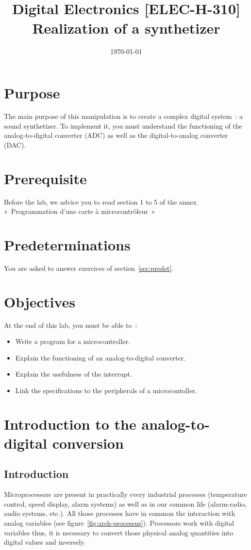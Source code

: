 \documentclass[11pt,a4paper]{article}
\date{\vspace{-1.7cm}\mydate\today}
\title{\vspace{-2cm} \labonumber\\ Digital Electronics [ELEC-H-310]\\Realization of a synthetizer\ifthenelse{\boolean{corrige}}{~\\Solution}{}}
\theoremstyle{definition}%
\begin{document}
\pagestyle{empty}
\maketitle
\section*{Purpose}
The main purpose of this manipulation is to create a complex digital system~: a sound synthetizer.
To implement it, you must understand the functioning of the analog-to-digital converter (ADC) as well as the digital-to-analog converter (DAC).

\section*{Prerequisite}
Before the lab, we advice you to read section 1 to 5 of the annex «~Programmation d’une carte à microcontrôleur~»

\section*{Predeterminations}
You are asked to answer exercices of section~\ref{sec:predet}.

\section*{Objectives}
At the end of this lab, you must be able to~:
\begin{itemize}
	\item Write a program for a microcontroller.
	\item Explain the functioning of an analog-to-digital converter.
	\item Explain the usefulness of the interrupt.
	\item Link the specifications to the peripherals of a microcontoller.
\end{itemize}

\newpage{}

\section{Introduction to the analog-to-digital conversion}

\subsection{Introduction}
Microprocessors are present in practically every industrial processes (temperature control, speed display, alarm systems) as well as in our common life (alarm-radio, audio systems, etc.).
All those processes have in common the interaction with analog variables (see figure~\ref{fig:arch-processus}).
Processors work with digital variables thus, it is necessary to convert those physical analog quantities into digital values and inversely.
\end{document}
